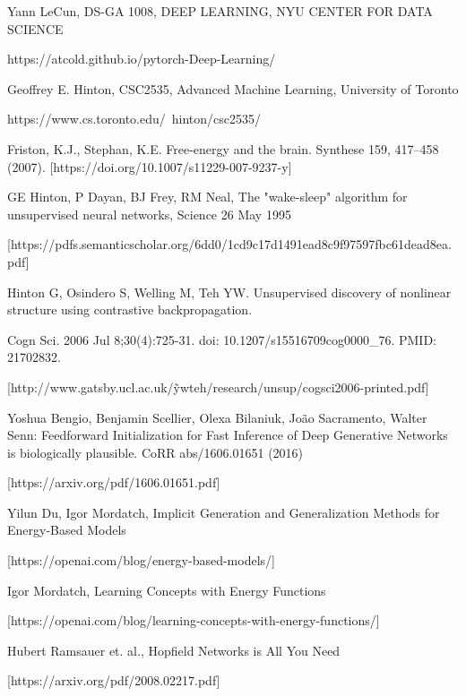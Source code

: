 \documentclass{article}
\begin{document}
\newpage
\begin{thebibliography}{}

\bibitem[]{}
Yann LeCun, DS-GA 1008, DEEP LEARNING, NYU CENTER FOR DATA SCIENCE

https://atcold.github.io/pytorch-Deep-Learning/

\bibitem[]{}
Geoffrey E. Hinton, CSC2535, Advanced Machine Learning, University of Toronto

https://www.cs.toronto.edu/~hinton/csc2535/

\bibitem[]{}
Friston, K.J., Stephan, K.E. Free-energy and the brain. Synthese 159, 417–458 (2007). [https://doi.org/10.1007/s11229-007-9237-y]

\bibitem[]{}
GE Hinton, P Dayan, BJ Frey, RM Neal, The "wake-sleep" algorithm for unsupervised neural networks, Science  26 May 1995

[https://pdfs.semanticscholar.org/6dd0/1cd9c17d1491ead8c9f97597fbc61dead8ea.pdf]

\bibitem[]{}
Hinton G, Osindero S, Welling M, Teh YW. Unsupervised discovery of nonlinear structure using contrastive backpropagation. 

Cogn Sci. 2006 Jul 8;30(4):725-31. doi: 10.1207/s15516709cog0000\_76. PMID: 21702832.

[http://www.gatsby.ucl.ac.uk/\~ywteh/research/unsup/cogsci2006-printed.pdf]

\bibitem[]{}
Yoshua Bengio, Benjamin Scellier, Olexa Bilaniuk, João Sacramento, Walter Senn:
Feedforward Initialization for Fast Inference of Deep Generative Networks is biologically plausible. CoRR abs/1606.01651 (2016)

[https://arxiv.org/pdf/1606.01651.pdf]

\bibitem[]{}
Yilun Du, Igor Mordatch, Implicit Generation and Generalization Methods for Energy-Based Models

[https://openai.com/blog/energy-based-models/]

\bibitem[]{}
Igor Mordatch, Learning Concepts with Energy Functions

[https://openai.com/blog/learning-concepts-with-energy-functions/]

\bibitem[]{}
Hubert Ramsauer et. al., Hopfield Networks is All You Need

[https://arxiv.org/pdf/2008.02217.pdf]
\end{thebibliography}
\end{document}
